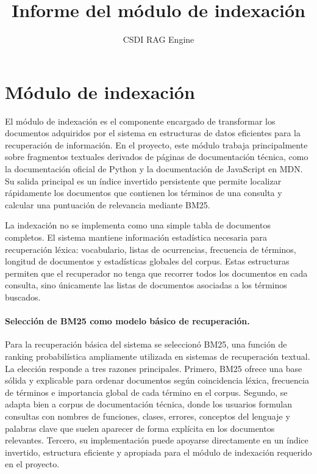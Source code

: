 \documentclass[11pt]{article}
\title{Informe del módulo de indexación}
\author{CSDI RAG Engine}
\date{}
\begin{document}
\maketitle

\section{Módulo de indexación}

El módulo de indexación es el componente encargado de transformar los documentos adquiridos
por el sistema en estructuras de datos eficientes para la recuperación de información. En el
proyecto, este módulo trabaja principalmente sobre fragmentos textuales derivados de páginas de
documentación técnica, como la documentación oficial de Python y la documentación de JavaScript
en MDN. Su salida principal es un índice invertido persistente que permite localizar rápidamente
los documentos que contienen los términos de una consulta y calcular una puntuación de relevancia
mediante BM25.

La indexación no se implementa como una simple tabla de documentos completos. El sistema
mantiene información estadística necesaria para recuperación léxica: vocabulario, listas de
ocurrencias, frecuencia de términos, longitud de documentos y estadísticas globales del corpus.
Estas estructuras permiten que el recuperador no tenga que recorrer todos los documentos en cada
consulta, sino únicamente las listas de documentos asociadas a los términos buscados.

\paragraph{Selección de BM25 como modelo básico de recuperación.}
Para la recuperación básica del sistema se seleccionó BM25, una función de ranking probabilística
ampliamente utilizada en sistemas de recuperación textual. La elección responde a tres razones
principales. Primero, BM25 ofrece una base sólida y explicable para ordenar documentos según
coincidencia léxica, frecuencia de términos e importancia global de cada término en el corpus.
Segundo, se adapta bien a corpus de documentación técnica, donde los usuarios formulan consultas
con nombres de funciones, clases, errores, conceptos del lenguaje y palabras clave que suelen
aparecer de forma explícita en los documentos relevantes. Tercero, su implementación puede
apoyarse directamente en un índice invertido, estructura eficiente y apropiada para el módulo de
indexación requerido en el proyecto.
\end{document}
